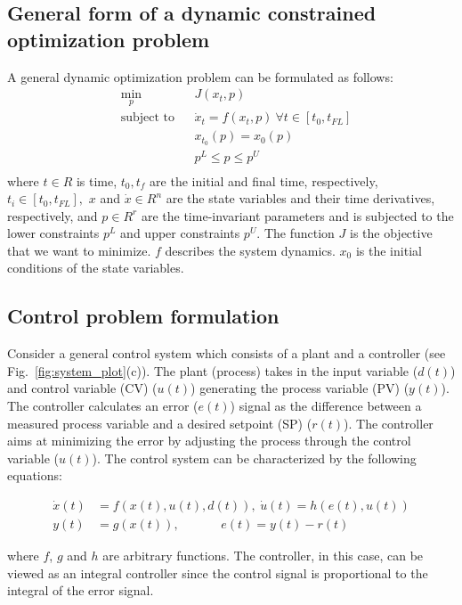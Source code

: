 \documentclass[runningheads]{llncs}
\begin{document}
\subsection*{General form of a dynamic constrained optimization problem }
A general dynamic optimization problem can be formulated as follows:
\begin{equation*}
\begin{aligned}
& \underset{p}{\text{min}}
& & J(x_{t},p) \\
& \text{subject to}
& & \dot{x}_t =  f(x_t,p) \ \forall t \in [t_0, t_{FL}] \\
&&& x_{t_0}(p) = x_0(p) \\
&&& p^L \leq p \leq p^U \\
\end{aligned}
\end{equation*}
where $t \in R$ is time, $t_0, t_f$ are the initial and final time, respectively, $t_i \in [t_0, t_{FL}],$ $x$ and $\dot{x} \in R^n$ are the state variables and their time derivatives, respectively, and $p \in R^r$ are the time-invariant parameters and is subjected to the lower constraints $p^L$ and upper constraints $p^U$. The function $J$ is the objective that we want to minimize. $f$ describes the system dynamics.  $x_0$ is the initial conditions of the state variables. 



\subsection*{Control problem formulation}
Consider a general control system which consists of a plant and a controller (see Fig.~\ref{fig:system_plot}(c)). The plant (process) takes in the input variable ($d(t)$) and control variable (CV) ($u(t)$) generating the process variable (PV) ($y(t)$). The controller calculates an error ($e(t)$) signal as the difference between a measured process variable and a desired setpoint (SP) ($r(t)$). The controller aims at minimizing the error by adjusting the process through the control variable ($u(t)$). The  control system can be characterized by the following equations:
\begin{small}
\setlength{\abovedisplayskip}{2pt}
\setlength{\belowdisplayskip}{2pt}
\begin{align}
\dot{x}(t) &= f(x(t),u(t),d(t)), \hspace{3pt} \dot{u}(t) =  h(e(t),u(t)) \\
y(t) &= g(x(t)), \hspace{40pt}  e(t) = y(t) - r(t)
\end{align}
\end{small}
where $f$, $g$ and $h$ are arbitrary functions. The controller, in this case, can be viewed as an integral controller since the control signal is proportional to the integral of the error signal.  
\end{document}
